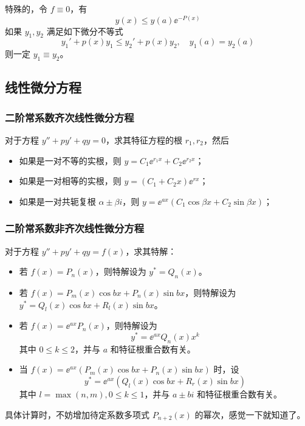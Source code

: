 特殊的，令 $f \equiv 0$，有
\[ y(x) \leqslant y(a) \ee^{-P(x)} \]
如果 $y_1, y_2$ 满足如下微分不等式
\[ y_1' + p(x) y_1 \leqslant y_2' + p(x) y_2, \quad y_1(a) = y_2(a) \]
则一定 $y_1 \equiv y_2$。

\subsection{线性微分方程}

\subsubsection*{二阶常系数齐次线性微分方程}

对于方程 $y'' + py' + qy = 0$，求其特征方程的根 $r_1, r_2$，然后
\begin{itemize}
	\item 如果是一对不等的实根，则 $y = C_1 \ee^{r_1x} + C_2 \ee^{r_2 x}$；
	\item 如果是一对相等的实根，则 $y = (C_1 + C_2 x) \ee^{rx}$；
	\item 如果是一对共轭复根 $\alpha \pm \beta i$，则 $y = \ee^{ax} (C_1 \cos \beta x + C_2 \sin \beta x)$；
\end{itemize}

\subsubsection*{二阶常系数非齐次线性微分方程}

对于方程 $y'' + py' + qy = f(x)$，求其特解：

\begin{itemize}
	\item 若 $f(x) = P_n(x)$，则特解设为 $y^* = Q_n(x)$。
	\item 若 $f(x) = P_m(x) \cos b x + P_n(x) \sin b x$，则特解设为 $y^* = Q_l(x) \cos b x + R_l(x) \sin b x$。
	\item 若 $f(x) = \ee^{a x} P_n(x)$，则特解设为
	      \[ y^* = \ee^{ax} Q_n(x) x^k \]
	      其中 $0 \leqslant k \leqslant 2$，并与 $a$ 和特征根重合数有关。
	\item 当 $f(x) = \ee^{ax}\left( P_m(x) \cos b x + P_n(x) \sin b x \right)$ 时，设
	      \[ y^* = \ee^{ax}\left( Q_l(x) \cos b x + R_r(x) \sin b x \right) \]
	      其中 $l = \max(n, m), 0 \leqslant k \leqslant 1$，并与 $a \pm bi$ 和特征根重合数有关。
\end{itemize}

具体计算时，不妨增加待定系数多项式 $P_{n+2}(x)$ 的幂次，感觉一下就知道了。
